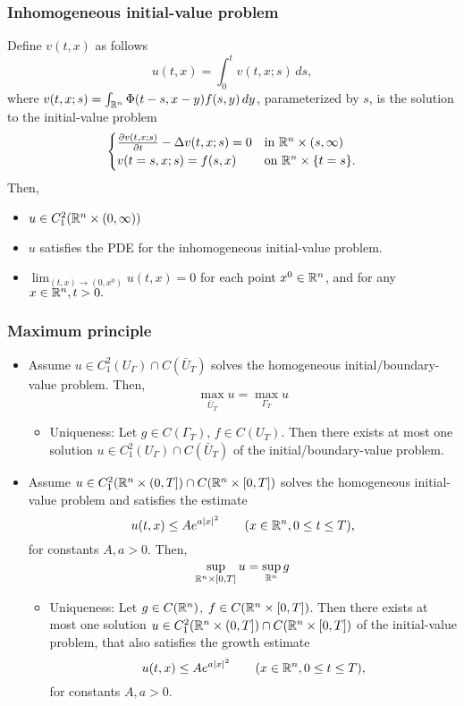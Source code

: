 \documentclass[oneside,a4paper,11pt]{report}
\begin{document}
\subsubsection{Inhomogeneous initial-value problem}
Define $v(t,x)$ as follows 
\[u(t,x) = \int_0^t v(t,x;s)\,ds,\] 
where $v(t,x;s) = \int_{{\mathbb{R}^n}} \Phi(t-s,x-y)f(s,y)\,dy$, parameterized by $s$, is the solution to the initial-value problem
\[ \begin{cases}
\frac{\partial v(t,x;s)}{\partial t} - \Delta v(t,x;s) = 0 & \text{in } {\mathbb{R}^n} \times  (s,\infty)\\
v(t=s,x;s) = f(s,x) & \text{on } {\mathbb{R}^n} \times \{t=s\}.
\end{cases}\]
Then,
\begin{itemize}
\item $u \in C_1^2({\mathbb{R}^n} \times (0,\infty))$
\item $u$ satisfies the PDE for the inhomogeneous initial-value problem.
\item $\lim_{(t,x) \to (0,x^0)} u(t,x) = 0$ for each point $x^0 \in {\mathbb{R}^n}$, and for any $x\in {\mathbb{R}^n}, t > 0.$
\end{itemize}

\subsubsection{Maximum principle}
\begin{itemize}

\item Assume $u \in C_1^2(U_\Gamma) \cap C(\bar{U}_T) $ solves the homogeneous initial/boundary-value problem. Then,
\[\max_{\bar{U}_T} u = \max_{\Gamma_T} u \]
\begin{itemize}
\item Uniqueness: Let $g \in C(\Gamma_T)$, $f \in C(U_T)$. Then there exists at most one solution $u \in C_1^2(U_\Gamma) \cap C(\bar{U}_T) $ of the initial/boundary-value problem.
\end{itemize}

\item Assume $u \in C_1^2({\mathbb{R}^n} \times (0,T]) \cap C({\mathbb{R}^n} \times [0,T])$ solves the homogeneous initial-value problem and satisfies the estimate 
\[u(t,x) \le Ae^{a|x|^2} \qquad (x \in {\mathbb{R}^n}, 0 \le t \le T), \]
for constants $A,a>0$. Then,
\[ \sup_{{{\mathbb{R}^n}} \times [0,T]} u = \sup_{{\mathbb{R}^n}} g\]
\begin{itemize}
\item Uniqueness: Let $g \in C({\mathbb{R}^n})$, $f \in C({\mathbb{R}^n} \times [0,T])$. Then there exists at most one solution $u \in C_1^2({\mathbb{R}^n} \times (0,T]) \cap C({\mathbb{R}^n} \times [0,T])$ of the initial-value problem, that also satisfies the growth estimate
\[u(t,x) \le Ae^{a|x|^2} \qquad (x \in {\mathbb{R}^n}, 0 \le t \le T), \]
for constants $A,a>0$. 
\end{itemize}

\end{itemize}
\end{document}
